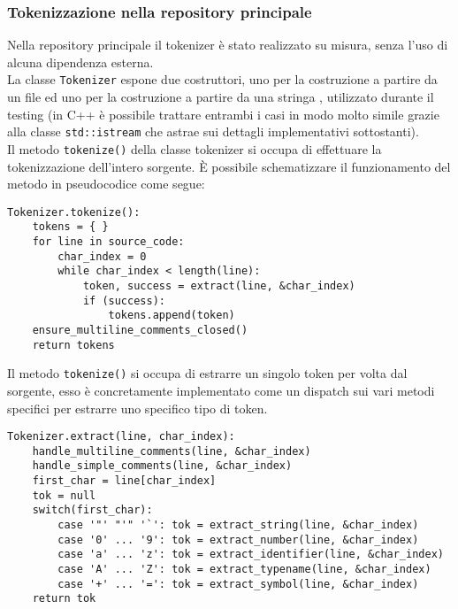 \subsubsection{Tokenizzazione nella repository principale}
Nella repository principale il tokenizer
è stato realizzato su misura, senza l'uso di alcuna
dipendenza esterna. \\

La classe \texttt{Tokenizer} espone due costruttori, 
uno per la costruzione a partire da un file ed uno 
per la costruzione a partire da una stringa 
, utilizzato durante il testing (in C++ è possibile 
trattare entrambi i casi in modo molto simile grazie
alla classe \texttt{std::istream} che astrae sui 
dettagli implementativi sottostanti). \\

Il metodo \texttt{tokenize()} della classe tokenizer 
si occupa di effettuare la tokenizzazione dell'intero sorgente. È
possibile schematizzare il funzionamento del metodo in pseudocodice come segue:

\vspace{0.5cm}
\begin{lstlisting}[frame=single]
Tokenizer.tokenize():
    tokens = { }
    for line in source_code:
        char_index = 0
        while char_index < length(line):
            token, success = extract(line, &char_index)
            if (success): 
                tokens.append(token)
    ensure_multiline_comments_closed()
    return tokens
\end{lstlisting}
\vspace{0.5cm}

Il metodo \texttt{tokenize()} si occupa di estrarre un singolo token 
per volta dal sorgente, esso è concretamente implementato come un dispatch 
sui vari metodi specifici per estrarre uno specifico tipo di token.

\vspace{0.5cm}
\begin{lstlisting}[frame=single]
Tokenizer.extract(line, char_index):
    handle_multiline_comments(line, &char_index)
    handle_simple_comments(line, &char_index)
    first_char = line[char_index]
    tok = null
    switch(first_char):
        case '"' "'" '`': tok = extract_string(line, &char_index)
        case '0' ... '9': tok = extract_number(line, &char_index)
        case 'a' ... 'z': tok = extract_identifier(line, &char_index)
        case 'A' ... 'Z': tok = extract_typename(line, &char_index)
        case '+' ... '=': tok = extract_symbol(line, &char_index)
    return tok
\end{lstlisting}    
\vspace{0.5cm}


